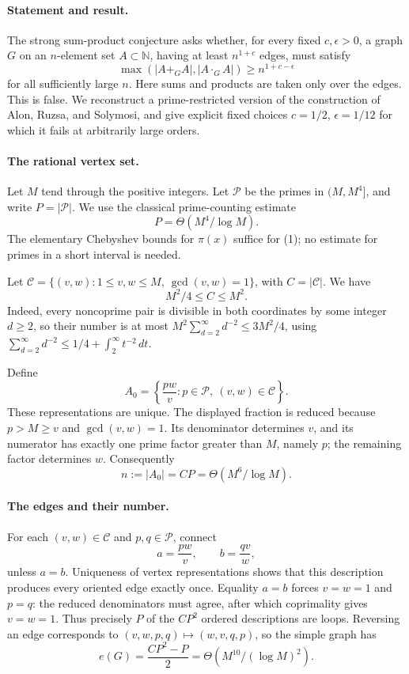 \paragraph{Statement and result.}
The strong sum-product conjecture asks whether, for every fixed \(c,\epsilon>0\), a graph \(G\) on an \(n\)-element set \(A\subset\mathbb N\), having at least \(n^{1+c}\) edges, must satisfy
\[
 \max(|A+_GA|,|A\cdot_GA|)\geq n^{1+c-\epsilon}
\]
for all sufficiently large \(n\). Here sums and products are taken only over the edges. This is false. We reconstruct a prime-restricted version of the construction of Alon, Ruzsa, and Solymosi, and give explicit fixed choices \(c=1/2\), \(\epsilon=1/12\) for which it fails at arbitrarily large orders.

\paragraph{The rational vertex set.}
Let \(M\) tend through the positive integers. Let \(\mathcal P\) be the primes in \((M,M^4]\), and write \(P=|\mathcal P|\). We use the classical prime-counting estimate
\[
 P=\Theta(M^4/\log M).
\tag{1}
\]
The elementary Chebyshev bounds for \(\pi(x)\) suffice for (1); no estimate for primes in a short interval is needed.

Let \(\mathcal C=\{(v,w):1\leq v,w\leq M,\ \gcd(v,w)=1\}\), with \(C=|\mathcal C|\). We have
\[
 M^2/4\leq C\leq M^2.
\tag{2}
\]
Indeed, every noncoprime pair is divisible in both coordinates by some integer \(d\geq2\), so their number is at most
\(M^2\sum_{d=2}^{\infty}d^{-2}\leq3M^2/4\), using
\(\sum_{d=2}^{\infty}d^{-2}\leq1/4+\int_2^\infty t^{-2}\,dt\).

Define
\[
 A_0=\left\{\frac{pw}{v}:p\in\mathcal P,\ (v,w)\in\mathcal C\right\}.
\]
These representations are unique. The displayed fraction is reduced because \(p>M\geq v\) and \(\gcd(v,w)=1\). Its denominator determines \(v\), and its numerator has exactly one prime factor greater than \(M\), namely \(p\); the remaining factor determines \(w\). Consequently
\[
 n:=|A_0|=CP=\Theta(M^6/\log M).
\tag{3}
\]

\paragraph{The edges and their number.}
For each \((v,w)\in\mathcal C\) and \(p,q\in\mathcal P\), connect
\[
 a=\frac{pw}{v},\qquad b=\frac{qv}{w},
\]
unless \(a=b\). Uniqueness of vertex representations shows that this description produces every oriented edge exactly once. Equality \(a=b\) forces \(v=w=1\) and \(p=q\): the reduced denominators must agree, after which coprimality gives \(v=w=1\). Thus precisely \(P\) of the \(CP^2\) ordered descriptions are loops. Reversing an edge corresponds to \((v,w,p,q)\mapsto(w,v,q,p)\), so the simple graph has
\[
 e(G)=\frac{CP^2-P}{2}
 =\Theta(M^{10}/(\log M)^2).
\tag{4}
\]

